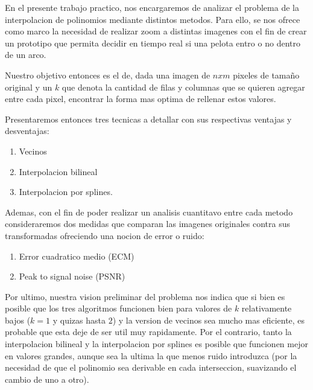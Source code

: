 En el presente trabajo practico, nos encargaremos de analizar el problema de la interpolacion de polinomios mediante distintos metodos. Para ello, se nos ofrece como marco la necesidad de realizar zoom a distintas imagenes con el fin de crear un prototipo que permita decidir en tiempo real si una pelota entro o no dentro de un arco.

Nuestro objetivo entonces es el de, dada una imagen de $n x m$ pixeles de tama\~no original y un $k$ que denota la cantidad de filas y columnas que se quieren agregar entre cada pixel, encontrar la forma mas optima de rellenar estos valores.

Presentaremos entonces tres tecnicas a detallar con sus respectivas ventajas y desventajas:
\begin{enumerate}
 \item Vecinos
 \item Interpolacion bilineal
 \item Interpolacion por splines.
\end{enumerate}

Ademas, con el fin de poder realizar un analisis cuantitavo entre cada metodo consideraremos dos medidas que comparan las imagenes originales contra sus transformadas ofreciendo una nocion de error o ruido:
\begin{enumerate}
 \item Error cuadratico medio (ECM)
 \item Peak to signal noise (PSNR)
\end{enumerate}

Por ultimo, nuestra vision preliminar del problema nos indica que si bien es posible que los tres algoritmos funcionen bien para valores de $k$ relativamente bajos ($k = 1$ y quizas hasta $2$) y la version de vecinos sea mucho mas eficiente, es probable que esta deje de ser util muy rapidamente. Por el contrario, tanto la interpolacion bilineal y la interpolacion por splines es posible que funcionen mejor en valores grandes, aunque sea la ultima la que menos ruido introduzca (por la necesidad de que el polinomio sea derivable en cada interseccion, suavizando el cambio de uno a otro). 

